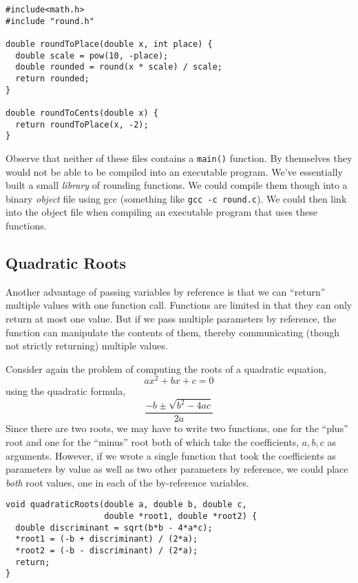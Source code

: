 \begin{verbatim}
#include<math.h>
#include "round.h"

double roundToPlace(double x, int place) {
  double scale = pow(10, -place);
  double rounded = round(x * scale) / scale;
  return rounded;
}

double roundToCents(double x) {
  return roundToPlace(x, -2);
}
\end{verbatim}

Observe that neither of these files contains a \texttt{main()}
function.  By themselves they would not be able to be compiled
into an executable program.  We've essentially built a small 
\emph{library} of rounding functions.  We could compile them though
into a binary \emph{object} file using gcc (something like 
\texttt{gcc -c round.c}).  We could then link into the object
file when compiling an executable program that uses these functions.

\subsection{Quadratic Roots}
\label{subsection:c:quadraticRoots}

Another advantage of passing variables by reference is that we
can ``return'' multiple values with one function call.  Functions
are limited in that they can only return at most one value.  But
if we pass multiple parameters by reference, the function can
manipulate the contents of them, thereby communicating (though
not strictly returning) multiple values.  

Consider again the problem of computing the roots of a quadratic
equation, 
  $$ax^2 + bx + c = 0$$
using the quadratic formula,
 $$\frac{-b \pm \sqrt{b^2 - 4ac}}{2a}$$
Since there are two roots, we may have to write two functions, 
one for the ``plus'' root and one for the ``minus'' root both of 
which take the coefficients, $a, b, c$ as arguments.  However,
if we wrote a single function that took the coefficients as parameters
by value as well as two other parameters by reference, we could
place \emph{both} root values, one in each of the by-reference
variables.

\begin{verbatim}
void quadraticRoots(double a, double b, double c, 
                    double *root1, double *root2) {
  double discriminant = sqrt(b*b - 4*a*c);
  *root1 = (-b + discriminant) / (2*a);
  *root2 = (-b - discriminant) / (2*a);
  return;
}
\end{verbatim}

